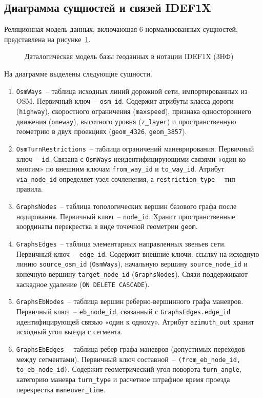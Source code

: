 \subsection{Диаграмма сущностей и связей IDEF1X}

Реляционная модель данных, включающая 6 нормализованных сущностей, представлена на рисунке~\ref{fig:idef1x_model}.

\begin{figure}[htbp]
    \centering
    
    \caption{Даталогическая модель базы геоданных в нотации IDEF1X (3НФ)}
    \label{fig:idef1x_model}
\end{figure}

На диаграмме выделены следующие сущности.
\begin{enumerate}
    \item \texttt{OsmWays}~-- таблица исходных линий дорожной сети, импортированных из OSM. Первичный ключ~-- \texttt{osm\_id}. Содержит атрибуты класса дороги (\texttt{highway}), скоростного ограничения (\texttt{maxspeed}), признака одностороннего движения (\texttt{oneway}), высотного уровня (\texttt{z\_layer}) и пространственную геометрию в двух проекциях (\texttt{geom\_4326}, \texttt{geom\_3857}).
    \item \texttt{OsmTurnRestrictions}~-- таблица ограничений маневрирования. Первичный ключ~-- \texttt{id}. Связана с \texttt{OsmWays} неидентифицирующими связями «один ко многим» по внешним ключам \texttt{from\_way\_id} и \texttt{to\_way\_id}. Атрибут \texttt{via\_node\_id} определяет узел сочленения, а \texttt{restriction\_type}~-- тип правила.
    \item \texttt{GraphsNodes}~-- таблица топологических вершин базового графа после нодирования. Первичный ключ~-- \texttt{node\_id}. Хранит пространственные координаты перекрестка в виде точечной геометрии \texttt{geom}.
    \item \texttt{GraphsEdges}~-- таблица элементарных направленных звеньев сети. Первичный ключ~-- \texttt{edge\_id}. Содержит внешние ключи: ссылку на исходную линию \texttt{source\_osm\_id} (\texttt{OsmWays}), начальную вершину \texttt{source\_node\_id} и конечную вершину \texttt{target\_node\_id} (\texttt{GraphsNodes}). Связи поддерживают каскадное удаление (\texttt{ON DELETE CASCADE}).
    \item \texttt{GraphsEbNodes}~-- таблица вершин реберно-вершинного графа маневров. Первичный ключ~-- \texttt{eb\_node\_id}, связанный с \texttt{GraphsEdges.edge\_id} идентифицирующей связью «один к одному». Атрибут \texttt{azimuth\_out} хранит исходный угол выезда с сегмента.
    \item \texttt{GraphsEbEdges}~-- таблица ребер графа маневров (допустимых переходов между сегментами). Первичный ключ составной~-- \texttt{(from\_eb\_node\_id, to\_eb\_node\_id)}. Содержит геометрический угол поворота \texttt{turn\_angle}, категорию маневра \texttt{turn\_type} и расчетное штрафное время проезда перекрестка \texttt{maneuver\_time}.
\end{enumerate}

